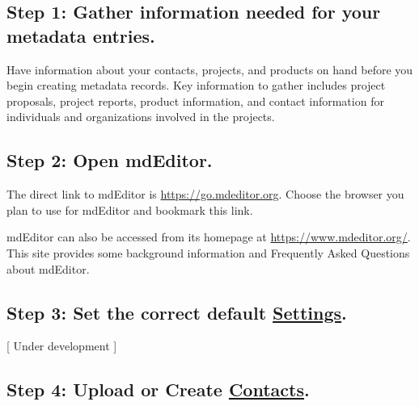 \documentclass[
]{book}
\begin{document}
\hypertarget{step-1-gather-information-needed-for-your-metadata-entries.}{%
\subsection*{Step 1: Gather information needed for your metadata entries.}\label{step-1-gather-information-needed-for-your-metadata-entries.}}

Have information about your contacts, projects, and products on hand before you begin creating metadata records. Key information to gather includes project proposals, project reports, product information, and contact information for individuals and organizations involved in the projects.

\hypertarget{step-2-open-mdeditor.}{%
\subsection*{Step 2: Open mdEditor.}\label{step-2-open-mdeditor.}}

The direct link to mdEditor is \url{https://go.mdeditor.org}. Choose the browser you plan to use for mdEditor and bookmark this link.

mdEditor can also be accessed from its homepage at \url{https://www.mdeditor.org/}. This site provides some background information and Frequently Asked Questions about mdEditor.

\hypertarget{step-3-set-the-correct-default-settings.}{%
\subsection*{\texorpdfstring{Step 3: Set the correct default \protect\hyperlink{settings}{Settings}.}{Step 3: Set the correct default Settings.}}\label{step-3-set-the-correct-default-settings.}}

{[} Under development {]}

\hypertarget{step-4-upload-or-create-contacts.}{%
\subsection*{\texorpdfstring{Step 4: Upload or Create \protect\hyperlink{contact-entry-guidance}{Contacts}.}{Step 4: Upload or Create Contacts.}}\label{step-4-upload-or-create-contacts.}}
\end{document}
